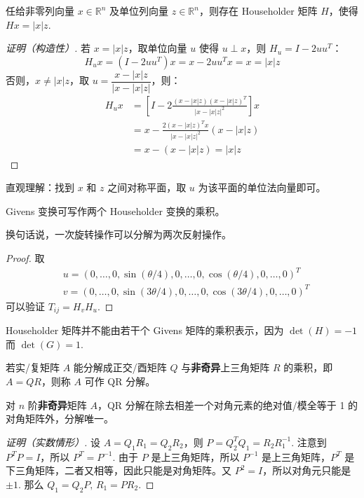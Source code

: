 \begin{theorem}
任给非零列向量 $x\in\mathbb R^n$ 及单位列向量 $z\in\mathbb R^n$，则存在 Householder 矩阵 $H$，使得 $Hx=|x|z$.
\end{theorem}
\begin{proof}[证明（构造性）]
若 $x=|x|z$，取单位向量 $u$ 使得 $u\perp x$，则 $H_u=I-2uu^T$：
\[
    H_ux=(I-2uu^T)x=x-2uu^Tx=x=|x|z
\]
否则，$x\neq|x|z$，取 $u=\dfrac{x-|x|z}{\left|x-|x|z\right|}$，则：
\begin{align*}
H_ux&=\left[I-2\frac{(x-|x|z)(x-|x|z)^T}{|x-|x|z|^2}\right]x\\
&=x-\frac{2(x-|x|z)^Tx}{|x-|x|z|^2}(x-|x|z)\\
&=x-(x-|x|z)=|x|z
\end{align*}
\end{proof}
\begin{remark}
直观理解：找到 $x$ 和 $z$ 之间对称平面，取 $u$ 为该平面的单位法向量即可。
\end{remark}

\begin{theorem}
Givens 变换可写作两个 Householder 变换的乘积。
\end{theorem}
\begin{remark}
换句话说，一次旋转操作可以分解为两次反射操作。
\end{remark}
\begin{proof}
取
\begin{align*}
    &u=(0,\ldots,0,\sin(\theta/4),0,\ldots,0,\cos(\theta/4),0,\ldots,0)^T\\
    &v=(0,\ldots,0,\sin(3\theta/4),0,\ldots,0,\cos(3\theta/4),0,\ldots,0)^T
\end{align*}
可以验证 $T_{ij}=H_vH_u$.
\end{proof}
\begin{note}
Householder 矩阵并不能由若干个 Givens 矩阵的乘积表示，因为 $\det(H)=-1$ 而 $\det(G)=1$.
\end{note}

\begin{definition}[QR 分解]
\label{def:qr}
若实/复矩阵 $A$ 能分解成正交/酉矩阵 $Q$ 与\textbf{非奇异}上三角矩阵 $R$ 的乘积，即 $A=QR$，则称 $A$ 可作 QR 分解。
\end{definition}

\begin{theorem}[非奇异方阵的 QR 分解]
\label{thm:qr1}
对 $n$ 阶\textbf{非奇异}矩阵 $A$，QR 分解在除去相差一个对角元素的绝对值/模全等于 1 的对角矩阵外，分解唯一。
\end{theorem}
\begin{proof}[证明（实数情形）]
设 $A=Q_1R_1=Q_2R_2$，则 $P=Q_2^TQ_1=R_2R_1^{-1}$. 注意到 $P^TP=I$，所以 $P^T=P^{-1}$.  由于 $P$ 是上三角矩阵，所以 $P^{-1}$ 是上三角矩阵，$P^T$ 是下三角矩阵，二者又相等，因此只能是对角矩阵。又 $P^2=I$，所以对角元只能是 $\pm1$.  那么 $Q_1=Q_2P,\,R_1=PR_2$.
\end{proof}

